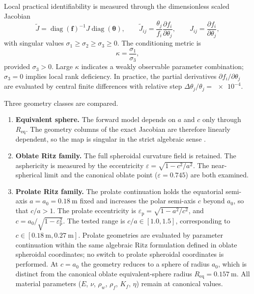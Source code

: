 Local practical identifiability is measured through the dimensionless scaled
Jacobian
\[
  \widetilde{J}
  =
  \operatorname{diag}(\mathbf{f})^{-1}
  J
  \operatorname{diag}(\boldsymbol{\theta}),
  \qquad
  \widetilde{J}_{ij}
  =
  \frac{\theta_j}{f_i}
  \frac{\partial f_i}{\partial \theta_j},
  \qquad
  J_{ij}=\frac{\partial f_i}{\partial \theta_j},
\]
with singular values $\sigma_1\geq\sigma_2\geq\sigma_3\geq 0$.  The
conditioning metric is
\[
  \kappa=\frac{\sigma_1}{\sigma_3},
\]
provided $\sigma_3>0$.  Large $\kappa$ indicates a weakly observable parameter
combination; $\sigma_3=0$ implies local rank deficiency.  In practice, the
partial derivatives $\partial f_i/\partial\theta_j$ are evaluated by central
finite differences with relative step
$\Delta\theta_j/\theta_j=\num{e-4}$.

Three geometry classes are compared.
\begin{enumerate}
  \item \textbf{Equivalent sphere.}  The forward model depends on $a$ and $c$
  only through $R_\mathrm{eq}$.  The geometry columns of the exact Jacobian are
  therefore linearly dependent, so the map is singular in the strict algebraic
  sense \cite{BrowntoneP7,BrowntoneP8}.
  \item \textbf{Oblate Ritz family.}  The full spheroidal curvature field is
  retained.  The asphericity is measured by the eccentricity
  $\varepsilon=\sqrt{1-c^2/a^2}$.  The near-spherical limit and the
  canonical oblate point ($\varepsilon=\num{0.745}$) are both examined.
  \item \textbf{Prolate Ritz family.}  The prolate continuation holds the
  equatorial semi-axis $a=a_0=\SI{0.18}{\metre}$ fixed and increases the
  polar semi-axis $c$ beyond $a_0$, so that $c/a>1$.  The prolate
  eccentricity is $\varepsilon_\mathrm{p}=\sqrt{1-a^2/c^2}$, and
  $c=a_0/\sqrt{1-\varepsilon_\mathrm{p}^2}$.  The tested range is
  $c/a\in[\num{1.0},\num{1.5}]$, corresponding to
  $c\in[\SI{0.18}{\metre},\SI{0.27}{\metre}]$.  Prolate geometries are
  evaluated by parameter continuation within the same algebraic Ritz
  formulation defined in oblate spheroidal coordinates; no switch to
  prolate spheroidal coordinates is performed.  At $c=a_0$ the geometry
  reduces to a sphere of radius $a_0$, which is distinct from the
  canonical oblate equivalent-sphere radius
  $R_\mathrm{eq}=\SI{0.157}{\metre}$.  All material parameters ($E$,
  $\nu$, $\rho_w$, $\rho_f$, $K_f$, $\eta$) remain at canonical values.
\end{enumerate}

